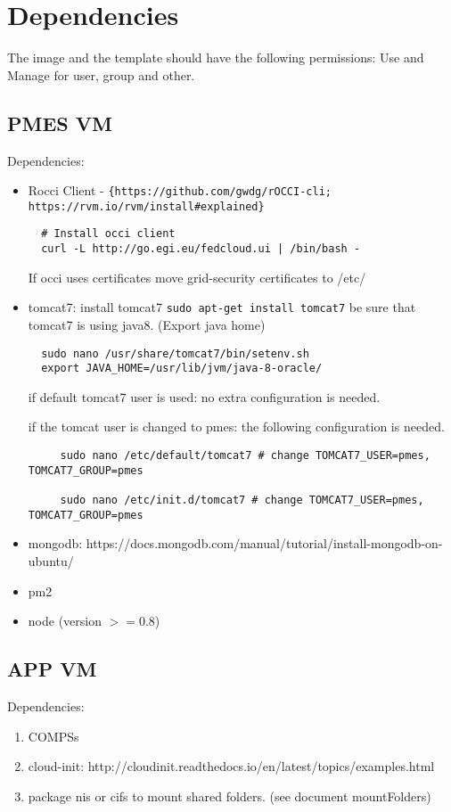 \documentclass[a4paper,10pt]{article}
\begin{document}
\section{Dependencies}
The image and the template should have the following permissions: Use and Manage for user, group and other.
\subsection{PMES VM}
Dependencies:
\begin{itemize}

 \item Rocci Client - \verb|{https://github.com/gwdg/rOCCI-cli; https://rvm.io/rvm/install#explained}|
 \begin{verbatim}
  # Install occi client
  curl -L http://go.egi.eu/fedcloud.ui | /bin/bash -
 \end{verbatim}
 
 \subitem If occi uses certificates move grid-security certificates to /etc/
 \item tomcat7: install tomcat7 \texttt{sudo apt-get install tomcat7}
 \subitem be sure that tomcat7 is using java8. (Export java home)
  \begin{verbatim}
  sudo nano /usr/share/tomcat7/bin/setenv.sh
  export JAVA_HOME=/usr/lib/jvm/java-8-oracle/
 \end{verbatim}
 \subitem if default tomcat7 user is used: no extra configuration is needed.
 
 \subitem if the tomcat user is changed to pmes: the following configuration is needed.
 \begin{verbatim}
     sudo nano /etc/default/tomcat7 # change TOMCAT7_USER=pmes, TOMCAT7_GROUP=pmes
     
     sudo nano /etc/init.d/tomcat7 # change TOMCAT7_USER=pmes, TOMCAT7_GROUP=pmes
 \end{verbatim}
 \item mongodb: https://docs.mongodb.com/manual/tutorial/install-mongodb-on-ubuntu/
 \item pm2
 \item node (version $>= 0.8$)
 
 \end{itemize}

 \subsection{APP VM}
 Dependencies:
 \begin{enumerate}
  \item COMPSs
  \item cloud-init: http://cloudinit.readthedocs.io/en/latest/topics/examples.html
  \item package nis or cifs to mount shared folders. (see document mountFolders)
 \end{enumerate}
\end{document}
